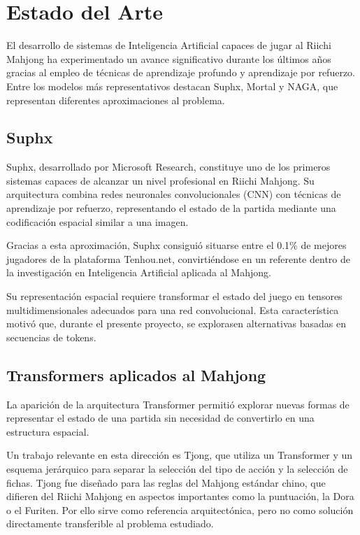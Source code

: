 \section{Estado del Arte}

El desarrollo de sistemas de Inteligencia Artificial capaces de jugar al Riichi Mahjong ha experimentado un avance significativo durante los últimos años gracias al empleo de técnicas de aprendizaje profundo y aprendizaje por refuerzo. Entre los modelos más representativos destacan Suphx, Mortal y NAGA, que representan diferentes aproximaciones al problema.

\subsection{Suphx}

Suphx\cite{li2020suphx}, desarrollado por Microsoft Research, constituye uno de los primeros sistemas capaces de alcanzar un nivel profesional en Riichi Mahjong. Su arquitectura combina redes neuronales convolucionales (CNN) con técnicas de aprendizaje por refuerzo, representando el estado de la partida mediante una codificación espacial similar a una imagen.

Gracias a esta aproximación, Suphx consiguió situarse entre el 0.1\% de mejores jugadores de la plataforma Tenhou.net, convirtiéndose en un referente dentro de la investigación en Inteligencia Artificial aplicada al Mahjong.

Su representación espacial requiere transformar el estado del juego en tensores multidimensionales adecuados para una red convolucional. Esta característica motivó que, durante el presente proyecto, se explorasen alternativas basadas en secuencias de tokens.

\subsection{Transformers aplicados al Mahjong}

La aparición de la arquitectura Transformer permitió explorar nuevas formas de representar el estado de una partida sin necesidad de convertirlo en una estructura espacial.

Un trabajo relevante en esta dirección es Tjong\cite{tjong}, que utiliza un Transformer y un esquema jerárquico para separar la selección del tipo de acción y la selección de fichas. Tjong fue diseñado para las reglas del Mahjong estándar chino, que difieren del Riichi Mahjong en aspectos importantes como la puntuación, la Dora o el Furiten. Por ello sirve como referencia arquitectónica, pero no como solución directamente transferible al problema estudiado.

